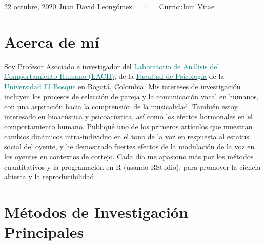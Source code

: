 \documentclass[11pt, a4paper]{awesome-cv}
\begin{document}
\makecvheader

\makecvfooter
  {22 octubre, 2020}
    {Juan David Leongómez~~~·~~~Curriculum Vitae}
  {\thepage}





\hypertarget{acerca-de-muxed}{%
\section{Acerca de mí}\label{acerca-de-muxed}}

Soy Profesor Asociado e investigador del \href{https://sites.google.com/unbosque.edu.co/lach-es}{\textcolor{teal}{Laboratorio de Análisis del Comportamiento Humano (LACH)}}, de la \href{https://www.uelbosque.edu.co/psicologia}{\textcolor{teal}{Facultad de Psicología}} de la \href{https://www.uelbosque.edu.co/}{\textcolor{teal}{Universidad El Bosque}} en Bogotá, Colombia. Mis intereses de investigación incluyen los procesos de selección de pareja y la comunicación vocal en humanos, con una aspiración hacia la comprensión de la musicalidad. También estoy interesado en bioacústica y psicoacústica, así como los efectos hormonales en el comportamiento humano. Publiqué uno de los primeros artículos que muestran cambios dinámicos intra-individuo en el tono de la voz en respuesta al estatus social del oyente, y he demostrado fuertes efectos de la modulación de la voz en los oyentes en contextos de cortejo. Cada día me apasiono más por los métodos cuantitativos y la programación en R (usando RStudio), para promover la ciencia abierta y la reproducibilidad.

\hypertarget{muxe9todos-de-investigaciuxf3n-principales}{%
\section{Métodos de Investigación Principales}\label{muxe9todos-de-investigaciuxf3n-principales}}
\end{document}
